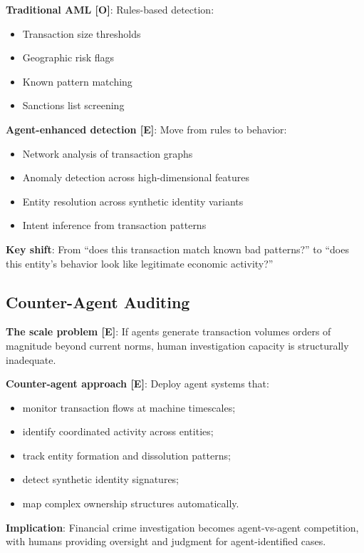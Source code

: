 \documentclass[11pt,letterpaper]{article}
\begin{document}
\textbf{Traditional AML [O]}: Rules-based detection:
\begin{itemize}
  \item Transaction size thresholds
  \item Geographic risk flags
  \item Known pattern matching
  \item Sanctions list screening
\end{itemize}

\textbf{Agent-enhanced detection [E]}: Move from rules to behavior:
\begin{itemize}
  \item Network analysis of transaction graphs
  \item Anomaly detection across high-dimensional features
  \item Entity resolution across synthetic identity variants
  \item Intent inference from transaction patterns
\end{itemize}

\textbf{Key shift}: From ``does this transaction match known bad patterns?'' to ``does this entity's behavior look like legitimate economic activity?''

\subsection{Counter-Agent Auditing}

\textbf{The scale problem [E]}: If agents generate transaction volumes orders of magnitude beyond current norms, human investigation capacity is structurally inadequate.

\textbf{Counter-agent approach [E]}: Deploy agent systems that:
\begin{itemize}
  \item monitor transaction flows at machine timescales;
  \item identify coordinated activity across entities;
  \item track entity formation and dissolution patterns;
  \item detect synthetic identity signatures;
  \item map complex ownership structures automatically.
\end{itemize}

\textbf{Implication}: Financial crime investigation becomes agent-vs-agent competition, with humans providing oversight and judgment for agent-identified cases.
\end{document}
